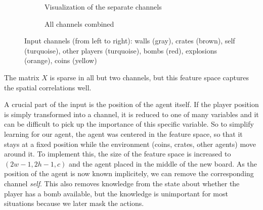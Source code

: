 \begin{figure}
  \centering
  \begin{subfigure}[b]{0.6\textwidth}
    \centering
    \usebox{\largestimage}
    \caption{Visualization of the separate channels}
  \end{subfigure}
  \quad
  \begin{subfigure}[b]{0.36\textwidth}
    \centering
    \caption{All channels combined}
  \end{subfigure}
  \caption{Input channels (from left to right): walls (gray), crates (brown), self (turquoise), other players (turquoise), bombs (red), explosions (orange), coins (yellow)}
  \label{fig:input-channels}
\end{figure}

The matrix $X$ is sparse in all but two channels, but this feature space captures the spatial correlations well.

A crucial part of the input is the position of the agent itself. If the player position is simply transformed into a channel, it is reduced to one of many variables and it can be difficult to pick up the importance of this specific variable. So to simplify learning for our agent, the agent was centered in the feature space, so that it stays at a fixed position while the environment (coins, crates, other agents) move around it. To implement this, the size of the feature space is increased to $(2w-1, 2h-1, c)$ and the agent placed in the middle of the new board. As the position of the agent is now known implicitely, we can remove the corresponding channel \emph{self}. This also removes knowledge from the state about whether the player has a bomb available, but the knowledge is unimportant for most situations because we later mask the actions.
